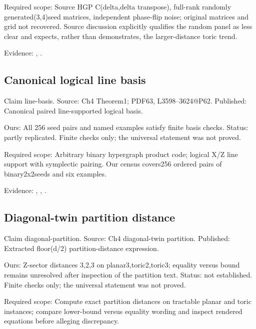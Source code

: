 Required scope: Source HGP C(delta,delta transpose), full-rank randomly generated(3,4)seed matrices, independent phase-flip noise; original matrices and grid not recovered. Source discussion explicitly qualifies the random panel as less clear and expects, rather than demonstrates, the larger-distance toric trend.

Evidence: \href{https://github.com/alectionary/vibe-math/blob/master/formalization/quintavalle-hgp/sources/browser-extraction.txt}{}, \href{https://github.com/alectionary/vibe-math/blob/master/formalization/quintavalle-hgp/availability.md}{}.
\subsection{Canonical logical line basis}\label{claim:line-basis}
Claim line-basis. Source: Ch4 Theorem1; PDF63, L3598--3624@P62. Published: Canonical paired line-supported logical basis.

Ours: All 256 seed pairs and named examples satisfy finite basis checks. Status: partly replicated. Finite checks only; the universal statement was not proved.

Required scope: Arbitrary binary hypergraph product code; logical X/Z line support with symplectic pairing. Our census covers256 ordered pairs of binary2x2seeds and six examples.

Evidence: \href{https://github.com/alectionary/vibe-math/blob/master/formalization/quintavalle-hgp/sources/browser-extraction.txt}{}, \href{https://github.com/alectionary/vibe-math/blob/master/formalization/quintavalle-hgp/availability.md}{}, \href{https://github.com/alectionary/vibe-math/blob/master/formalization/quintavalle-hgp/results/exact_checks.json}{}.
\subsection{Diagonal-twin partition distance}\label{claim:diagonal-partition}
Claim diagonal-partition. Source: Ch4 diagonal-twin partition. Published: Extracted floor(d/2) partition-distance expression.

Ours: Z-sector distances 3,2,3 on planar3,toric2,toric3; equality versus bound remains unresolved after inspection of the partition text. Status: not established. Finite checks only; the universal statement was not proved.

Required scope: Compute exact partition distances on tractable planar and toric instances; compare lower-bound versus equality wording and inspect rendered equations before alleging discrepancy.

